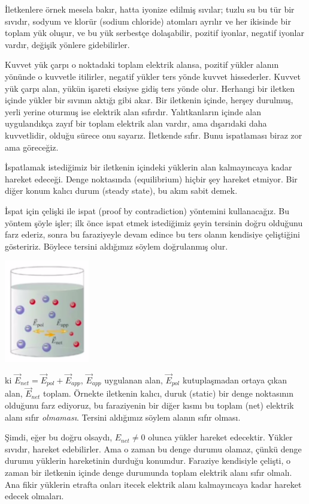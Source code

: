\documentclass[12pt,fleqn]{article}\usepackage{../../common}
\begin{document}
İletkenlere örnek mesela bakır, hatta iyonize edilmiş sıvılar; tuzlu su bu
tür bir sıvıdır, sodyum ve klorür (sodium chloride) atomları ayrılır ve her
ikisinde bir toplam yük oluşur, ve bu yük serbestçe dolaşabilir, pozitif
iyonlar, negatif iyonlar vardır, değişik yönlere gidebilirler.

Kuvvet yük çarpı o noktadaki toplam elektrik alansa, pozitif yükler alanın
yönünde o kuvvetle itilirler, negatif yükler ters yönde kuvvet hissederler.
Kuvvet yük çarpı alan, yükün işareti eksiyse gidiş ters yönde
olur. Herhangi bir iletken içinde yükler bir sıvının aktığı gibi akar. Bir
iletkenin içinde, herşey durulmuş, yerli yerine oturmuş ise elektrik alan
sıfırdır. Yalıtkanların içinde alan uygulandıkça zayıf bir toplam elektrik
alan vardır, ama dışarıdaki daha kuvvetlidir, olduğu sürece onu
sayarız. İletkende sıfır. Bunu ispatlaması biraz zor ama göreceğiz.

İspatlamak istediğimiz bir iletkenin içindeki yüklerin alan kalmayıncaya
kadar hareket edeceği. Denge noktasında (equilibrium) hiçbir şey hareket
etmiyor. Bir diğer konum kalıcı durum (steady state), bu akım sabit demek.

İspat için çelişki ile ispat (proof by contradiction) yöntemini
kullanacağız. Bu yöntem şöyle işler; ilk önce ispat etmek istediğimiz şeyin
tersinin doğru olduğunu farz ederiz, sonra bu faraziyeyle devam edince bu
ters olanın kendisiye çeliştiğini gösteririz. Böylece tersini aldığımız
söylem doğrulanmış olur.

\includegraphics[width=10em]{04_10.png}

ki $\vec{E}_{net} = \vec{E}_{pol} + \vec{E}_{app}$, $\vec{E}_{app}$
uygulanan alan, $\vec{E}_{pol}$ kutuplaşmadan ortaya çıkan alan,
$\vec{E}_{net}$ toplam. Örnekte iletkenin kalıcı, duruk (static) bir denge
noktasının olduğunu farz ediyoruz, bu faraziyenin bir diğer kısmı bu toplam
(net) elektrik alanı sıfır {\em olmaması}. Tersini aldığımız söylem alanın
sıfır olması.

Şimdi, eğer bu doğru olsaydı, $E_{net} \ne 0$ olunca yükler hareket
edecektir. Yükler sıvıdır, hareket edebilirler. Ama o zaman bu denge durumu
olamaz, çünkü denge durumu yüklerin hareketinin durduğu konumdur. Faraziye
kendisiyle çelişti, o zaman bir iletkenin içinde denge durumunda toplam
elektrik alanı sıfır olmalı. Ana fikir yüklerin etrafta onları itecek
elektrik alanı kalmayıncaya kadar hareket edecek olmaları.
\end{document}
